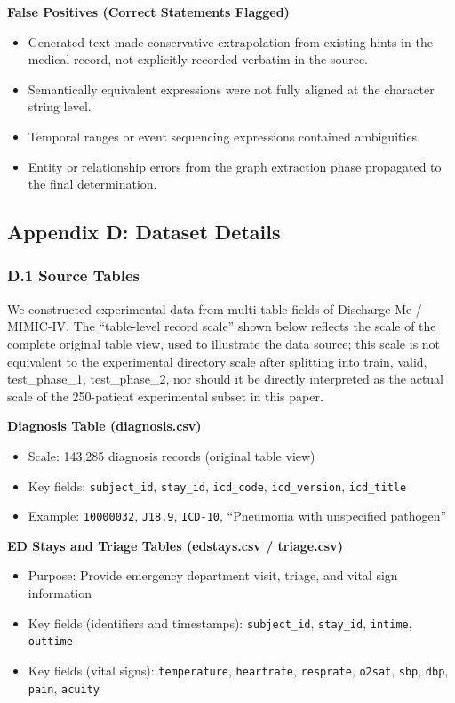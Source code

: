 \documentclass[11pt]{article}
\providecommand{\tightlist}{\setlength{\itemsep}{0pt}\setlength{\parskip}{0pt}}
\begin{document}
\textbf{False Positives (Correct Statements Flagged)}

\begin{itemize}
\tightlist
\item
  Generated text made conservative extrapolation from existing hints in the medical record, not explicitly recorded verbatim in the source.
\item
  Semantically equivalent expressions were not fully aligned at the character string level.
\item
  Temporal ranges or event sequencing expressions contained ambiguities.
\item
  Entity or relationship errors from the graph extraction phase propagated to the final determination.
\end{itemize}

\subsection{Appendix D: Dataset Details}

\subsubsection{D.1 Source Tables}

We constructed experimental data from multi-table fields of Discharge-Me / MIMIC-IV. The ``table-level record scale'' shown below reflects the scale of the complete original table view, used to illustrate the data source; this scale is not equivalent to the experimental directory scale after splitting into train, valid, test\_phase\_1, test\_phase\_2, nor should it be directly interpreted as the actual scale of the 250-patient experimental subset in this paper.

\textbf{Diagnosis Table (diagnosis.csv)}

\begin{itemize}
\tightlist
\item
  Scale: 143,285 diagnosis records (original table view)
\item
  Key fields: \texttt{subject\_id}, \texttt{stay\_id}, \texttt{icd\_code}, \texttt{icd\_version}, \texttt{icd\_title}
\item
  Example: \texttt{10000032}, \texttt{J18.9}, \texttt{ICD-10}, ``Pneumonia with unspecified pathogen''
\end{itemize}

\textbf{ED Stays and Triage Tables (edstays.csv / triage.csv)}

\begin{itemize}
\tightlist
\item
  Purpose: Provide emergency department visit, triage, and vital sign information
\item
  Key fields (identifiers and timestamps): \texttt{subject\_id}, \texttt{stay\_id}, \texttt{intime}, \texttt{outtime}
\item
  Key fields (vital signs): \texttt{temperature}, \texttt{heartrate}, \texttt{resprate}, \texttt{o2sat}, \texttt{sbp}, \texttt{dbp}, \texttt{pain}, \texttt{acuity}
\end{itemize}
\end{document}
